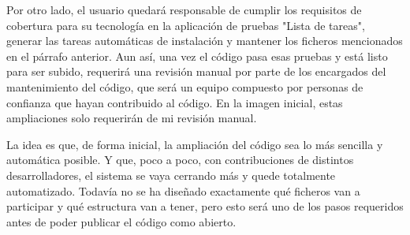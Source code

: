 Por otro lado, el usuario quedará responsable de cumplir los requisitos de cobertura para su tecnología en la aplicación de pruebas "Lista de tareas", generar las tareas automáticas de instalación y mantener los ficheros mencionados en el párrafo anterior. Aun así, una vez el código pasa esas pruebas y está listo para ser subido, requerirá una revisión manual por parte de los encargados del mantenimiento del código, que será un equipo compuesto por personas de confianza que hayan contribuido al código. En la imagen inicial, estas ampliaciones solo requerirán de mi revisión manual.

La idea es que, de forma inicial, la ampliación del código sea lo más sencilla y automática posible. Y que, poco a poco, con contribuciones de distintos desarrolladores, el sistema se vaya cerrando más y quede totalmente automatizado. Todavía no se ha diseñado exactamente qué ficheros van a participar y qué estructura van a tener, pero esto será uno de los pasos requeridos antes de poder publicar el código como abierto.
